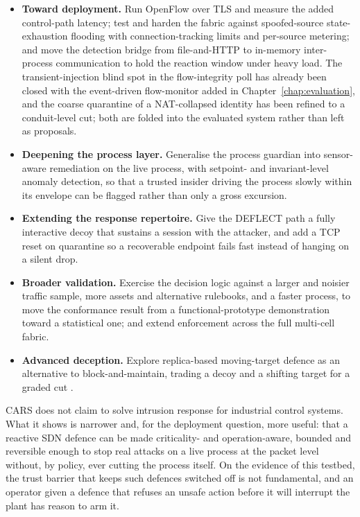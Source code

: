 \begin{itemize}
\item \textbf{Toward deployment.} Run OpenFlow over TLS and measure the added control-path latency; test and harden the fabric against spoofed-source state-exhaustion flooding with connection-tracking limits and per-source metering; and move the detection bridge from file-and-HTTP to in-memory inter-process communication to hold the reaction window under heavy load. The transient-injection blind spot in the flow-integrity poll has already been closed with the event-driven flow-monitor added in Chapter~\ref{chap:evaluation}, and the coarse quarantine of a NAT-collapsed identity has been refined to a conduit-level cut; both are folded into the evaluated system rather than left as proposals.
\item \textbf{Deepening the process layer.} Generalise the process guardian into sensor-aware remediation on the live process, with setpoint- and invariant-level anomaly detection, so that a trusted insider driving the process slowly within its envelope can be flagged rather than only a gross excursion.
\item \textbf{Extending the response repertoire.} Give the DEFLECT path a fully interactive decoy that sustains a session with the attacker, and add a TCP reset on quarantine so a recoverable endpoint fails fast instead of hanging on a silent drop.
\item \textbf{Broader validation.} Exercise the decision logic against a larger and noisier traffic sample, more assets and alternative rulebooks, and a faster process, to move the conformance result from a functional-prototype demonstration toward a statistical one; and extend enforcement across the full multi-cell fabric.
\item \textbf{Advanced deception.} Explore replica-based moving-target defence as an alternative to block-and-maintain, trading a decoy and a shifting target for a graded cut \cite{etxezarreta2026replica}.
\end{itemize}

\noindent
CARS does not claim to solve intrusion response for industrial control systems. What it shows is narrower and, for the deployment question, more useful: that a reactive SDN defence can be made criticality- and operation-aware, bounded and reversible enough to stop real attacks on a live process at the packet level without, by policy, ever cutting the process itself. On the evidence of this testbed, the trust barrier that keeps such defences switched off is not fundamental, and an operator given a defence that refuses an unsafe action before it will interrupt the plant has reason to arm it.
